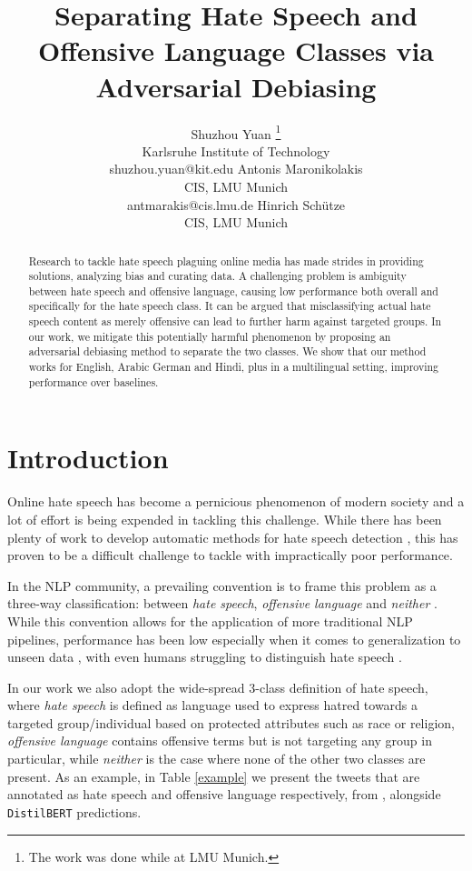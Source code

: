 \documentclass[11pt]{article}
\title{\textbf{Separating Hate Speech and Offensive Language Classes via Adversarial Debiasing}}
\author{Shuzhou Yuan \thanks{\quad The work was done while at LMU Munich.} \\ Karlsruhe Institute of Technology \\  shuzhou.yuan@kit.edu
         \And 
         Antonis Maronikolakis \\ CIS, LMU Munich\\ antmarakis@cis.lmu.de
         \And
         Hinrich Schütze \\ CIS, LMU Munich }
\begin{document}
	\maketitle
	\begin{abstract}
		
		Research to tackle hate speech plaguing online media has made strides in providing solutions, analyzing bias and curating data. A challenging problem is ambiguity between hate speech and offensive language, causing low performance both overall and specifically for the hate speech class. It can be argued that misclassifying actual hate speech content as merely offensive can lead to further harm against targeted groups. In our work, we mitigate this potentially harmful phenomenon by proposing an adversarial debiasing method to separate the two classes. We show that our method works for English, Arabic German and Hindi, plus in a multilingual setting, improving performance over baselines.
		
	\end{abstract}
	
	\section{Introduction}\label{intro}
	
	Online hate speech has become a pernicious phenomenon of modern society and a lot of effort is being expended in tackling this challenge. While there has been plenty of work to develop automatic methods for hate speech detection \cite{schmidt2017survey}, this has proven to be a difficult challenge to tackle with impractically poor performance.
	
	In the NLP community, a prevailing convention is to frame this problem as a three-way classification: between \textit{hate speech}, \textit{offensive language} and \textit{neither} \cite{davidson,mulki-etal-2019-l,founta,mubarak-etal-2017-abusive,mathur-etal-2018-offend}. While this convention allows for the application of more traditional NLP pipelines, performance has been low \cite{mozafari2019bert,davidson} especially when it comes to generalization to unseen data \cite{hate_speech_cross_dataset}, with even humans struggling to distinguish hate speech \cite{chatzakou2017mean,are_you_racist}.
	
	In our work we also adopt the wide-spread 3-class definition of hate speech, where \textit{hate speech} is defined as language used to express hatred towards a targeted group/individual based on protected attributes such as race or religion, \textit{offensive language} contains offensive terms but is not targeting any group in particular, while \textit{neither} is the case where none of the other two classes are present. As an example, in Table \ref{example} we present the tweets that are annotated as hate speech and offensive language respectively, from \citet{davidson}, alongside \texttt{DistilBERT} predictions.
	
\end{document}
